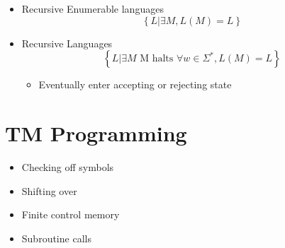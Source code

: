   \begin{itemize}
    \item Recursive Enumerable languages
    \begin{equation}
      \left\{ L | \exists M, L(M) = L \right\}
    \end{equation}

    \item Recursive Languages
    \begin{equation}
      \left\{ L | \exists M \text{ M halts } \forall w \in \Sigma^{*}, L(M) = L \right\}
    \end{equation}
    \begin{itemize}
      \item Eventually enter accepting or rejecting state
    \end{itemize}
  \end{itemize}

\section{TM Programming}

  \begin{itemize}
    \item Checking off symbols
    \item Shifting over
    \item Finite control memory
    \item Subroutine calls
  \end{itemize}
